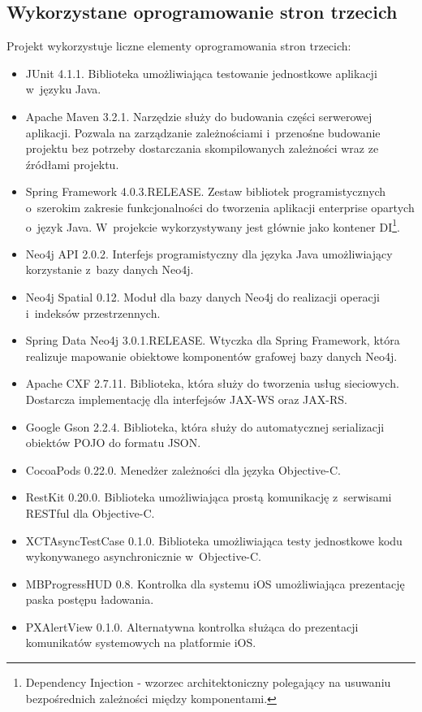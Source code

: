 \documentclass[a4paper,12pt]{article}
\begin{document}
	\subsection*{Wykorzystane oprogramowanie stron trzecich}

	Projekt wykorzystuje liczne elementy oprogramowania stron trzecich:

	\begin{itemize}
		\item JUnit 4.1.1. Biblioteka umożliwiająca testowanie jednostkowe aplikacji w~języku Java.
		\item Apache Maven 3.2.1. Narzędzie służy do budowania części serwerowej aplikacji. Pozwala na zarządzanie zależnościami i~przenośne budowanie projektu bez potrzeby dostarczania skompilowanych zależności wraz ze źródłami projektu.
		\item Spring Framework 4.0.3.RELEASE. Zestaw bibliotek programistycznych o~szerokim zakresie funkcjonalności do tworzenia aplikacji enterprise opartych o~język Java. W~projekcie wykorzystywany jest głównie jako kontener DI\footnote{Dependency Injection - wzorzec architektoniczny polegający na usuwaniu bezpośrednich zależności między komponentami.}.
		\item Neo4j API 2.0.2. Interfejs programistyczny dla języka Java umożliwiający korzystanie z~bazy danych Neo4j.
		\item Neo4j Spatial 0.12. Moduł dla bazy danych Neo4j do realizacji operacji i~indeksów przestrzennych. 
		\item Spring Data Neo4j 3.0.1.RELEASE. Wtyczka dla Spring Framework, która realizuje mapowanie obiektowe komponentów grafowej bazy danych Neo4j.
		\item Apache CXF 2.7.11. Biblioteka, która służy do tworzenia usług sieciowych. Dostarcza implementację dla interfejsów JAX-WS oraz JAX-RS.
		\item Google Gson 2.2.4. Biblioteka, która służy do automatycznej serializacji obiektów POJO do formatu JSON.
		\item CocoaPods 0.22.0. Menedżer zależności dla języka Objective-C.
		\item RestKit 0.20.0. Biblioteka umożliwiająca prostą komunikację z~serwisami RESTful dla Objective-C.
		\item XCTAsyncTestCase 0.1.0. Biblioteka umożliwiająca testy jednostkowe kodu wykonywanego asynchronicznie w~Objective-C.
		\item MBProgressHUD 0.8. Kontrolka dla systemu iOS umożliwiająca prezentację paska postępu ładowania.
		\item PXAlertView 0.1.0. Alternatywna kontrolka służąca do prezentacji komunikatów systemowych na platformie iOS.
	\end{itemize}
\end{document}
